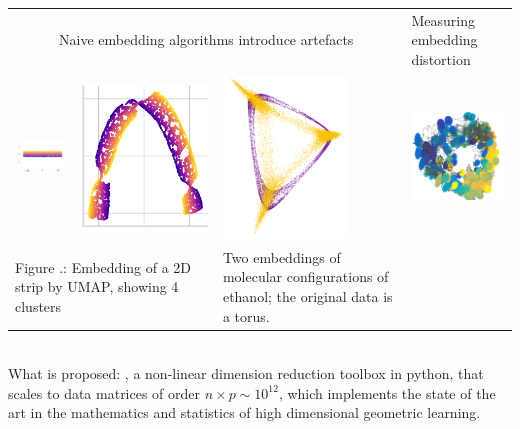 \documentclass[floatfix,11pt]{article}
\begin{document}
\begin{tabular}{llll}
\multicolumn{3}{c}{Naive embedding algorithms introduce artefacts}
&
Measuring embedding distortion
\\
\includegraphics[width=1.9in]{Figures/D1_original_data.png} &
\includegraphics[width=1.in]{Figures/umap_mindist_comp.png} &
\includegraphics[width=1.3in,angle=90]{Figures/geometric_vs_normalized.png}
&
\includegraphics[width=1.3in]{Figures/aspirin-postclu1-phi234Rmetric-tau22.png}
\\
\multicolumn{2}{l}{\parbox{3in}{Figure .: Embedding of a 2D strip by UMAP, showing 4 clusters}}
&
\parbox{2.1in}{Two embeddings of molecular configurations of ethanol; the original data is a torus.}\\
\end{tabular}
\\ What is proposed: \gmani, a non-linear dimension reduction toolbox
in python, that scales to data matrices of order $n\times p \sim
10^{12}$, which implements the state of the art in the mathematics and
statistics of high dimensional geometric learning.
\end{document}
